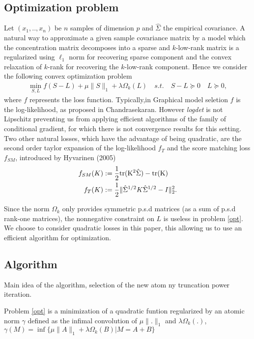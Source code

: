 \subsection{Optimization problem}
Let $(x_1,..,x_n)$ be $n$ samples of dimension $p$ and   $\hat{\Sigma}$ the empirical covariance. A natural way to approximate a given sample covariance matrix by a model which the concentration matrix decomposes into a sparse and $k$-low-rank matrix is a regularized using $\ell_1$ norm for recovering sparse component and the convex relaxation of $k$-rank for recovering the $k$-low-rank component. Hence we consider the following convex optimization problem
\begin{align}
\label{opt}
\min_{S,L} f(S-L)+\mu\|S\|_{1}+\lambda\Omega_k(L) \quad s.t. \quad S-L \succeq 0 \quad L \succeq 0,
\end{align}
where  $f$ represents the loss function. Typically,in Graphical model seletion $f$ is the log-likelihood, as proposed in Chandrasekaran. However \textit{logdet} is not Lipschitz preventing us from applying efficient algorithms of the family of conditional gradient, for which there is not convergence results for this setting.  Two other natural losses, which have the advantage of being quadratic, are the second order taylor expansion of the log-likelihood $f_{T}$ and the score matching loss $f_{SM}$, introduced by Hyvarinen (2005)
\begin{align}
f_{SM}(K)&:=\frac{1}{2}\rm tr(K^2 \hat{\Sigma})-\rm tr(K) \\
f_{T}(K)&:=\frac{1}{2}\|\hat{\Sigma}^{1/2}K\hat{\Sigma}^{1/2}-I\|_2^2.
\end{align}

Since the norm $\Omega_k$ only provides symmetric p.s.d matrices (as a sum of p.s.d rank-one matrices), the nonnegative constraint on $L$ is useless in problem \ref{opt}. 
We choose to consider quadratic losses in this paper, this allowing us to use an efficient algorithm for optimization.


\subsection{Algorithm}
Main idea of the algorithm, selection of the new atom ny truncation power iteration.

Problem \ref{opt} is a minimization of a quadratic funtion regularized by an atomic norm $\gamma$  defined as the infimal convolution of $\mu\|.\|_{1}$ and $\lambda\Omega_k(.)$, $\gamma(M)=\inf\{\mu\|A\|_{1}+\lambda\Omega_k(B)|M=A+B\}$

